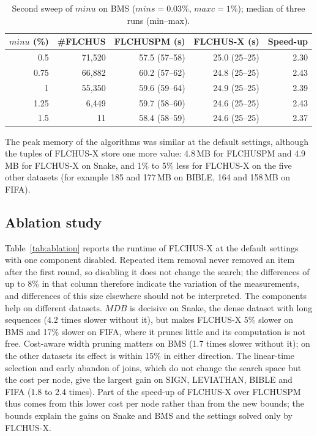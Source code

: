 \documentclass[runningheads]{llncs}
\newcommand{\FL}{\textsc{FLCHUSPM}}
\newcommand{\FX}{\textsc{FLCHUS-X}}
\newcommand{\mdb}{\ensuremath{\mathit{MDB}}}
\newcommand{\minu}{\ensuremath{\mathit{minu}}}
\newcommand{\maxc}{\ensuremath{\mathit{maxc}}}
\newcommand{\mins}{\ensuremath{\mathit{mins}}}
\begin{document}
\begin{table}[t]
\centering
\caption{Second sweep of \minu{} on BMS ($\mins = 0.03\%$, $\maxc = 1\%$); median of three runs
(min--max).}
\label{tab:bmsmu}
\begin{tabular}{@{}rrrrr@{}}
\toprule
\minu{} (\%) & \#FLCHUS & \FL{} (s) & \FX{} (s) & Speed-up \\
\midrule
0.5 & 71{,}520 & 57.5 (57--58) & 25.0 (25--25) & 2.30 \\
0.75 & 66{,}882 & 60.2 (57--62) & 24.8 (25--25) & 2.43 \\
1 & 55{,}350 & 59.6 (59--64) & 24.9 (25--25) & 2.39 \\
1.25 & 6{,}449 & 59.7 (58--60) & 24.6 (25--25) & 2.43 \\
1.5 & 11 & 58.4 (58--59) & 24.6 (25--25) & 2.37 \\
\bottomrule
\end{tabular}
\end{table}

The peak memory of the algorithms was similar at the default settings, although the tuples of
\FX{} store one more value: 4.8\,MB for \FL{} and 4.9\,MB for \FX{} on Snake, and 1\% to 5\% less
for \FX{} on the five other datasets (for example 185 and 177\,MB on BIBLE, 164 and 158\,MB on
FIFA).

\subsection{Ablation study}

Table~\ref{tab:ablation} reports the runtime of \FX{} at the default settings with one component
disabled. Repeated item removal never removed an item after the first round, so disabling it does
not change the search; the differences of up to 8\% in that column therefore indicate the
variation of the measurements, and differences of this size elsewhere should not be
interpreted. The components help on different datasets. \mdb{} is decisive on Snake, the dense
dataset with long sequences (4.2 times slower without it), but makes \FX{} 5\% slower on BMS and
17\% slower on FIFA, where it prunes little and its computation is not free. Cost-aware width
pruning matters on BMS (1.7 times slower without it); on the other datasets its effect is within
15\% in either direction.
The linear-time selection and early abandon of joins, which do not change the search space but
the cost per node, give the largest gain on SIGN, LEVIATHAN, BIBLE and FIFA (1.8 to 2.4 times).
Part of the speed-up of \FX{} over \FL{} thus comes from this lower cost per node rather than
from the new bounds; the bounds explain the gains on Snake and BMS and the settings solved
only by \FX{}.
\end{document}
